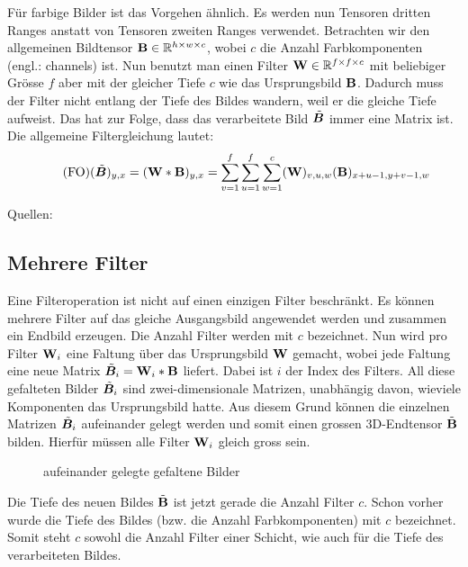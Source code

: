 \para{}
Für farbige Bilder ist das Vorgehen ähnlich. Es werden nun
Tensoren dritten Ranges anstatt von Tensoren zweiten Ranges verwendet.
Betrachten wir den allgemeinen Bildtensor $\mathbf{B} \in \mathbb{R}^{h \times w
  \times c}$, wobei $c$ die Anzahl Farbkomponenten (engl.: channels) ist.
Nun benutzt man einen Filter $\mathbf{W} \in \mathbb{R}^{f \times f \times c}$ mit beliebiger Grösse
$f$ aber mit der gleicher Tiefe $c$ wie das Ursprungsbild $\mathbf{B}$.
Dadurch muss der Filter nicht entlang der Tiefe des Bildes wandern, weil er
die gleiche Tiefe aufweist. Das hat zur Folge, dass das verarbeitete
Bild $\tilde{\bm{B}}$ immer eine Matrix ist.
Die allgemeine Filtergleichung lautet:
\\
\begin{equation}\tag{FO}
  (\tilde{\bm{B}})_{y,x} = (\mathbf{W} * \mathbf{B})_{y,x} = \sum_{v=1}^{f} \sum_{u=1}^{f} \sum_{w=1}^c (\mathbf{W})_{v,u,w} (\mathbf{B})_{x+u-1,y+v-1,w}
\end{equation}

\para{}
Quellen: \cite{Goodfellow-et-al-2016} \cite{deeplearning.ai:cnn} \cite{wiki:cnn}

\subsection{Mehrere Filter}
Eine Filteroperation ist nicht auf einen einzigen Filter beschränkt. Es können
mehrere Filter auf das gleiche Ausgangsbild angewendet werden und zusammen ein
Endbild erzeugen.
\para{}
Die Anzahl Filter werden mit $c$ bezeichnet.
Nun wird pro Filter $\mathbf{W}_i$ eine Faltung über das Ursprungsbild $\mathbf{W}$ gemacht, wobei
jede Faltung eine neue Matrix $\tilde{\bm{B}}_i = \mathbf{W}_i * \mathbf{B}$ liefert.
Dabei ist $i$ der Index des Filters. All diese gefalteten Bilder
$\tilde{\bm{B}}_i$ sind zwei-dimensionale Matrizen, unabhängig davon, wieviele
Komponenten das Ursprungsbild hatte. Aus diesem Grund können die einzelnen
Matrizen $\tilde{\bm{B}}_i$ aufeinander gelegt werden und somit einen grossen 3D-Endtensor
$\tilde{\mathbf{B}}$ bilden.
Hierfür müssen alle Filter $\mathbf{W}_i$ gleich gross sein.
\begin{figure}[h!]
  \caption{aufeinander gelegte gefaltene Bilder}

\end{figure}
Die Tiefe des neuen Bildes $\tilde{\mathbf{B}}$ ist jetzt gerade die Anzahl Filter $c$.
Schon vorher wurde die Tiefe des Bildes (bzw. die Anzahl
Farbkomponenten) mit $c$ bezeichnet. Somit steht $c$ sowohl die Anzahl Filter
einer Schicht, wie auch für die Tiefe des verarbeiteten Bildes.

